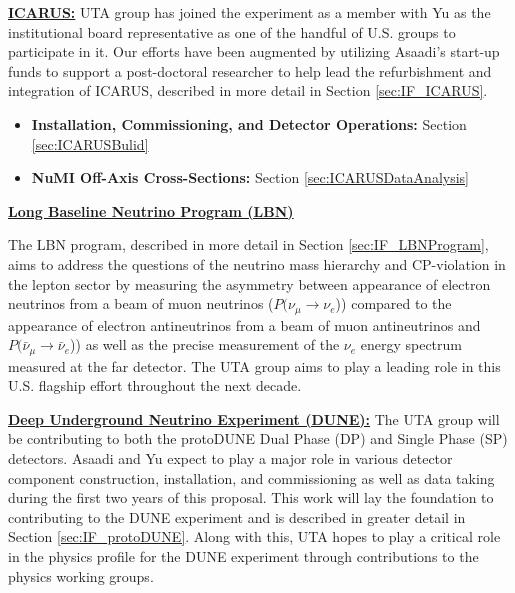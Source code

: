 \noindent \underline{\textbf{ICARUS:}} UTA group has joined the experiment as a member with Yu as the institutional board representative as one of the handful of U.S. groups to participate in it. Our efforts have been augmented by utilizing Asaadi's start-up funds to support a post-doctoral researcher to help lead the refurbishment and integration of ICARUS, described in more detail in Section \ref{sec:IF_ICARUS}.

\begin{itemize}
\item{\textbf{Installation, Commissioning, and Detector Operations:}} Section \ref{sec:ICARUSBulid}

\item{\textbf{NuMI Off-Axis Cross-Sections:}} Section \ref{sec:ICARUSDataAnalysis}

\end{itemize}

\begin{center}
\underline{\Large\textbf{Long Baseline Neutrino Program (LBN)}}
\end{center}
The LBN program, described in more detail in Section \ref{sec:IF_LBNProgram}, aims to address the questions of the neutrino mass hierarchy and CP-violation in the lepton sector by measuring the asymmetry between appearance of electron neutrinos from a beam of muon neutrinos ($P(\nu_{\mu} \rightarrow \nu_{e}$)) compared to the appearance of electron antineutrinos from a beam of muon antineutrinos and $P(\bar{\nu}_{\mu} \rightarrow \bar{\nu}_{e}$)) as well as the precise measurement of the $\nu_{e}$ energy spectrum measured at the far detector. The UTA group aims to play a leading role in this U.S. flagship effort throughout the next decade. 

\noindent \textbf{\underline{Deep Underground Neutrino Experiment (DUNE):}} The UTA group will be contributing to both the protoDUNE Dual Phase (DP) and Single Phase (SP) detectors. Asaadi and Yu expect to play a major role in various detector component construction, installation, and commissioning as well as data taking during the first two years of this proposal. This work will lay the foundation to contributing to the DUNE experiment and is described in greater detail in Section \ref{sec:IF_protoDUNE}. Along with this, UTA hopes to play a critical role in the physics profile for the DUNE experiment through contributions to the physics working groups.

